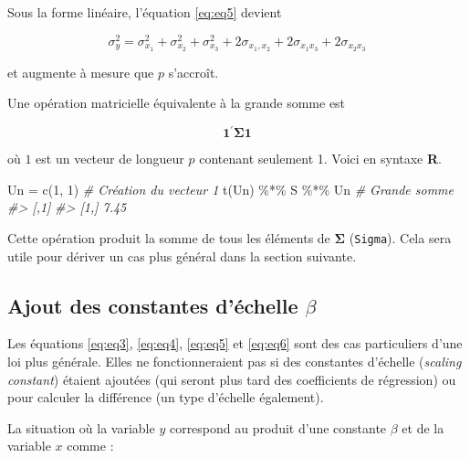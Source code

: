 \documentclass[
]{book}
\newenvironment{Shaded}{}{}
\newcommand{\CommentTok}[1]{\textit{#1}}
\newcommand{\DecValTok}[1]{#1}
\newcommand{\FunctionTok}[1]{#1}
\newcommand{\NormalTok}[1]{#1}
\newcommand{\OtherTok}[1]{#1}
\newcommand{\SpecialCharTok}[1]{#1}
\begin{document}
Sous la forme linéaire, l'équation \eqref{eq:eq5} devient

\begin{equation}
\sigma_y^2=\sigma_{x_1}^2+\sigma_{x_2}^2+\sigma_{x_3}^2+2\sigma_{x_1,x_2}+2\sigma_{x_1 x_3}+2\sigma_{x_2 x_3}
\label{eq:eq6}
\end{equation}

et augmente à mesure que \(p\) s'accroît.

Une opération matricielle équivalente à la grande somme est

\begin{equation}
\mathbf{1}^{\prime} \mathbf{\Sigma} \mathbf{1}
\label{eq:GS}
\end{equation}

où \(1\) est un vecteur de longueur \(p\) contenant seulement 1. Voici en syntaxe \textbf{R}.

\begin{Shaded}
\begin{Highlighting}[]
\NormalTok{Un }\OtherTok{=} \FunctionTok{c}\NormalTok{(}\DecValTok{1}\NormalTok{, }\DecValTok{1}\NormalTok{)        }\CommentTok{\# Création du vecteur 1}
\FunctionTok{t}\NormalTok{(Un) }\SpecialCharTok{\%*\%}\NormalTok{ S }\SpecialCharTok{\%*\%}\NormalTok{ Un  }\CommentTok{\# Grande somme}
\CommentTok{\#\textgreater{}      [,1]}
\CommentTok{\#\textgreater{} [1,] 7.45}
\end{Highlighting}
\end{Shaded}

Cette opération produit la somme de tous les éléments de \(\mathbf{\Sigma}\) (\texttt{Sigma}). Cela sera utile pour dériver un cas plus général dans la section suivante.

\hypertarget{ajout-des-constantes-duxe9chelle-beta}{%
\subsection{\texorpdfstring{Ajout des constantes d'échelle \(\beta\)}{Ajout des constantes d'échelle \textbackslash beta}}\label{ajout-des-constantes-duxe9chelle-beta}}

Les équations \eqref{eq:eq3}, \eqref{eq:eq4}, \eqref{eq:eq5} et \eqref{eq:eq6} sont des cas particuliers d'une loi plus générale. Elles ne fonctionneraient pas si des constantes d'échelle (\emph{scaling constant}) étaient ajoutées (qui seront plus tard des coefficients de régression) ou pour calculer la différence (un type d'échelle également).

La situation où la variable \(y\) correspond au produit d'une constante \(\beta\) et de la variable \(x\) comme :
\end{document}
